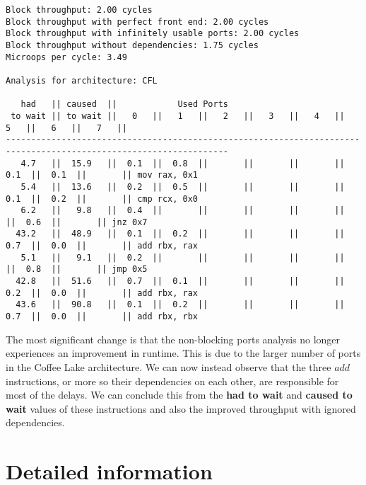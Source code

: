 \documentclass[a4paper,12pt,titlepage, twoside]{report}
\begin{document}
\begin{mdframed}[backgroundcolor=light-gray, roundcorner=10pt,leftmargin=1, rightmargin=1, innerleftmargin=15, innertopmargin=15,innerbottommargin=15, outerlinewidth=1, linecolor=light-gray]
\begin{center}
\begin{BVerbatim}[fontsize=\tiny]
Block throughput: 2.00 cycles
Block throughput with perfect front end: 2.00 cycles
Block throughput with infinitely usable ports: 2.00 cycles
Block throughput without dependencies: 1.75 cycles
Microops per cycle: 3.49

Analysis for architecture: CFL

   had   || caused  ||            Used Ports
 to wait || to wait ||   0   ||   1   ||   2   ||   3   ||   4   ||   5   ||   6   ||   7   ||
------------------------------------------------------------------------------------------------------------------
   4.7   ||  15.9   ||  0.1  ||  0.8  ||       ||       ||       ||  0.1  ||  0.1  ||       || mov rax, 0x1
   5.4   ||  13.6   ||  0.2  ||  0.5  ||       ||       ||       ||  0.1  ||  0.2  ||       || cmp rcx, 0x0
   6.2   ||   9.8   ||  0.4  ||       ||       ||       ||       ||       ||  0.6  ||       || jnz 0x7
  43.2   ||  48.9   ||  0.1  ||  0.2  ||       ||       ||       ||  0.7  ||  0.0  ||       || add rbx, rax
   5.1   ||   9.1   ||  0.2  ||       ||       ||       ||       ||       ||  0.8  ||       || jmp 0x5
  42.8   ||  51.6   ||  0.7  ||  0.1  ||       ||       ||       ||  0.2  ||  0.0  ||       || add rbx, rax
  43.6   ||  90.8   ||  0.1  ||  0.2  ||       ||       ||       ||  0.7  ||  0.0  ||       || add rbx, rbx
\end{BVerbatim}
\end{center}
\end{mdframed}

The most significant change is that the non-blocking ports analysis no longer experiences an improvement in runtime. This is due to the larger number of ports in the Coffee Lake architecture. We can now instead observe that the three $add$ instructions, or more so their dependencies on each other, are responsible for most of the delays. We can conclude this from the \textbf{had to wait} and \textbf{caused to wait} values of these instructions and also the improved throughput with ignored dependencies.



\section{Detailed information}
\label{sec:detail}
\end{document}
